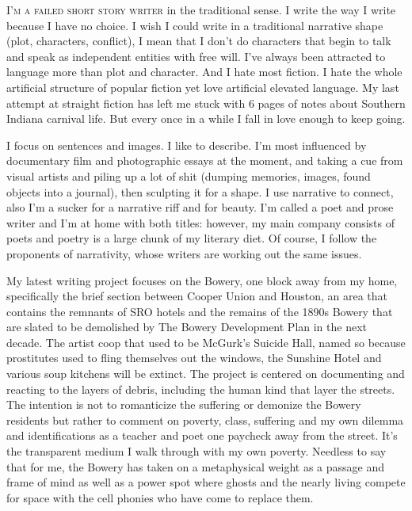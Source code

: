 \documentclass[
]{memoir}
\begin{document}
\lettrine[lines=3, findent=0em, nindent=0.1em, lhang=0]{I}{’m a failed short story writer}
in the traditional sense. I write the way I write because I have no
choice. I wish I could write in a traditional narrative shape (plot,
characters, conflict), I mean that I don't do characters that begin to
talk and speak as independent entities with free will. I've always been
attracted to language more than plot and character. And I hate most
fiction. I hate the whole artificial structure of popular fiction yet
love artificial elevated language. My last attempt at straight fiction
has left me stuck with 6 pages of notes about Southern Indiana carnival
life. But every once in a while I fall in love enough to keep going.

I focus on sentences and images. I like to describe. I'm most influenced
by documentary film and photographic essays at the moment, and taking a
cue from visual artists and piling up a lot of shit (dumping memories,
images, found objects into a journal), then sculpting it for a shape. I
use narrative to connect, also I'm a sucker for a narrative riff and for
beauty. I'm called a poet and prose writer and I'm at home with both
titles: however, my main company consists of poets and poetry is a large
chunk of my literary diet. Of course, I follow the proponents of
narrativity, whose writers are working out the same issues.

My latest writing project focuses on the Bowery, one block away from my
home, specifically the brief section between Cooper Union and Houston,
an area that contains the remnants of SRO hotels and the remains of the
1890s Bowery that are slated to be demolished by The Bowery Development
Plan in the next decade. The artist coop that used to be McGurk's
Suicide Hall, named so because prostitutes used to fling themselves out
the windows, the Sunshine Hotel and various soup kitchens will be
extinct. The project is centered on documenting and reacting to the
layers of debris, including the human kind that layer the streets. The
intention is not to romanticize the suffering or demonize the Bowery
residents but rather to comment on poverty, class, suffering and my own
dilemma and identifications as a teacher and poet one paycheck away from
the street. It's the transparent medium I walk through with my own
poverty. Needless to say that for me, the Bowery has taken on a
metaphysical weight as a passage and frame of mind as well as a power
spot where ghosts and the nearly living compete for space with the cell
phonies who have come to replace them.
\end{document}
